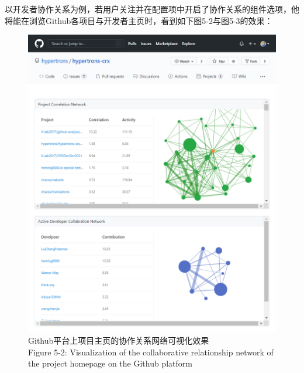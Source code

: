 \par 以开发者协作关系为例，若用户关注并在配置项中开启了协作关系的组件选项，他将能在浏览Github各项目与开发者主页时，看到如下图5-2与图5-3的效果：
\begin{figure}[H]
    \centering
    \includegraphics[width=130mm]{./figures/成果展示.png}
    \caption{Github平台上项目主页的协作关系网络可视化效果\\Figure 5-2: Visualization of the collaborative relationship network of the project homepage on the Github platform}
\end{figure}
